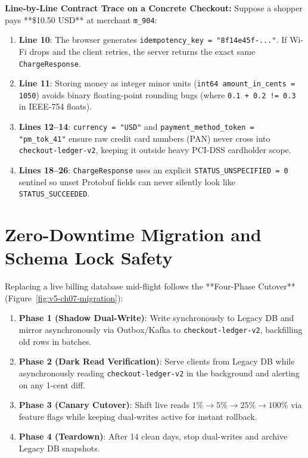 \textbf{Line-by-Line Contract Trace on a Concrete Checkout:}
Suppose a shopper pays **\$10.50 USD** at merchant \texttt{m\_904}:
\begin{enumerate}[leftmargin=18pt]
  \item \textbf{Line 10}: The browser generates \texttt{idempotency\_key = "8f14e45f-..."}. If Wi-Fi drops and the client retries, the server returns the exact same \texttt{ChargeResponse}.
  \item \textbf{Line 11}: Storing money as integer minor units (\texttt{int64 amount\_in\_cents = 1050}) avoids binary floating-point rounding bugs (where \texttt{0.1 + 0.2 != 0.3} in IEEE-754 floats).
  \item \textbf{Lines 12--14}: \texttt{currency = "USD"} and \texttt{payment\_method\_token = "pm\_tok\_41"} ensure raw credit card numbers (PAN) never cross into \texttt{checkout-ledger-v2}, keeping it outside heavy PCI-DSS cardholder scope.
  \item \textbf{Lines 18--26}: \texttt{ChargeResponse} uses an explicit \texttt{STATUS\_UNSPECIFIED = 0} sentinel so unset Protobuf fields can never silently look like \texttt{STATUS\_SUCCEEDED}.
\end{enumerate}

\section{Zero-Downtime Migration and Schema Lock Safety}

Replacing a live billing database mid-flight follows the **Four-Phase Cutover** (Figure~\ref{fig:v5-ch07-migration}):
\begin{enumerate}[leftmargin=18pt]
  \item \textbf{Phase 1 (Shadow Dual-Write)}: Write synchronously to Legacy DB and mirror asynchronously via Outbox/Kafka to \texttt{checkout-ledger-v2}, backfilling old rows in batches.
  \item \textbf{Phase 2 (Dark Read Verification)}: Serve clients from Legacy DB while asynchronously reading \texttt{checkout-ledger-v2} in the background and alerting on any 1-cent diff.
  \item \textbf{Phase 3 (Canary Cutover)}: Shift live reads $1\% \rightarrow 5\% \rightarrow 25\% \rightarrow 100\%$ via feature flags while keeping dual-writes active for instant rollback.
  \item \textbf{Phase 4 (Teardown)}: After 14 clean days, stop dual-writes and archive Legacy DB snapshots.
\end{enumerate}

